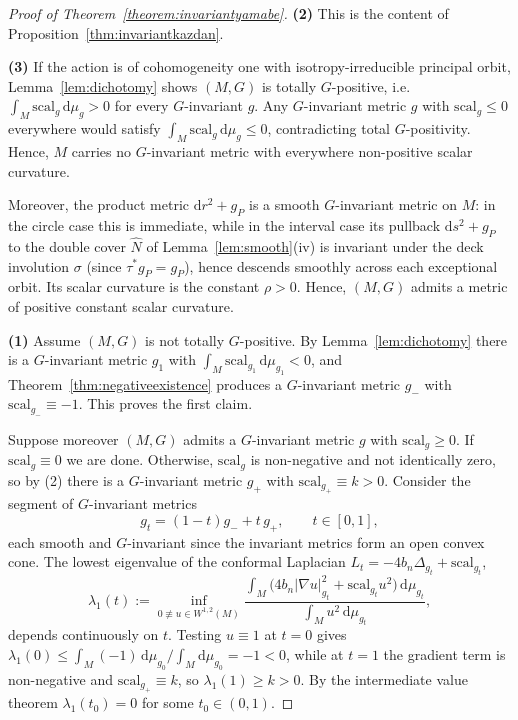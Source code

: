 \documentclass[12pt,a4paper]{amsart}
\theoremstyle{plain}
\theoremstyle{definition}
\theoremstyle{remark}
\newcommand{\ga}{\mathit{g}} %
\begin{document}
\begin{proof}[Proof of Theorem~\ref{theorem:invariantyamabe}]
\textbf{(2)} This is the content of Proposition~\ref{thm:invariantkazdan}.

\textbf{(3)} If the action is of cohomogeneity one with isotropy-irreducible
principal orbit, Lemma~\ref{lem:dichotomy} shows $(M,G)$ is totally $G$-positive, i.e.
$\int_M\mathrm{scal}_\ga\,\mathrm{d}\mu_\ga>0$ for every $G$-invariant $\ga$. Any $G$-invariant metric $\ga$ with $\mathrm{scal}_\ga\le 0$ everywhere would satisfy
$\int_M\mathrm{scal}_\ga\,\mathrm{d}\mu_\ga\le 0$, contradicting total $G$-positivity. Hence, $M$ carries no $G$-invariant metric with everywhere non-positive scalar curvature.

Moreover, the product metric $\mathrm{d} r^2+\ga_P$ is a smooth $G$-invariant metric on $M$: in the
circle case this is immediate, while in the interval case its pullback $\mathrm{d} s^2+\ga_P$ to the
double cover $\widehat N$ of Lemma~\ref{lem:smooth}(iv) is invariant under the deck involution
$\sigma$ (since $\tau^*\ga_P=\ga_P$), hence descends smoothly across each exceptional orbit.
Its scalar curvature is the constant $\rho>0$. Hence, $(M, G)$ admits a metric
of positive constant scalar curvature.

\textbf{(1)} Assume $(M,G)$ is not totally $G$-positive.
By Lemma~\ref{lem:dichotomy} there is a $G$-invariant metric $\ga_1$ with
$\int_M\mathrm{scal}_{\ga_1}\,\mathrm{d}\mu_{\ga_1}<0$, and Theorem~\ref{thm:negativeexistence} produces
a $G$-invariant metric $\ga_-$ with $\mathrm{scal}_{\ga_-}\equiv-1$. This proves the first claim.

Suppose moreover $(M,G)$ admits a $G$-invariant metric $\ga$ with $\mathrm{scal}_\ga\ge0$. If
$\mathrm{scal}_\ga\equiv0$ we are done. Otherwise, $\mathrm{scal}_\ga$ is non-negative and not
identically zero, so by (2) there is a $G$-invariant metric $\ga_+$ with
$\mathrm{scal}_{\ga_+}\equiv k>0$. Consider the segment of $G$-invariant metrics
\[
\ga_t=(1-t)\ga_-+t\,\ga_+,\qquad t\in[0,1],
\]
each smooth and $G$-invariant since the invariant metrics form an open convex cone. The lowest
eigenvalue of the conformal Laplacian $L_t=-4b_n\Delta_{\ga_t}+\mathrm{scal}_{\ga_t}$,
\[
\lambda_1(t):=\inf_{0\not\equiv u\in W^{1,2}(M)}
\frac{\int_M\!\big(4b_n|\nabla u|_{\ga_t}^2+\mathrm{scal}_{\ga_t}u^2\big)\,\mathrm{d}\mu_{\ga_t}}
{\int_M u^2\,\mathrm{d}\mu_{\ga_t}},
\]
depends continuously on $t$. Testing $u\equiv1$ at $t=0$ gives
$\lambda_1(0)\le\int_M(-1)\,\mathrm{d}\mu_{\ga_0}/\int_M\mathrm{d}\mu_{\ga_0}=-1<0$, while at $t=1$ the gradient term is non-negative and $\mathrm{scal}_{\ga_+}\equiv k$,
so $\lambda_1(1)\ge k>0$. By
the intermediate value theorem $\lambda_1(t_0)=0$ for some $t_0\in(0,1)$.


\end{proof}
\end{document}
